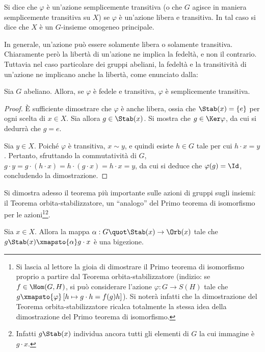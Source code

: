 \documentclass[12pt]{scrartcl}
\begin{document}
	\begin{definition}
		Si dice che $\varphi$ è un'azione semplicemente transitiva (o che $G$ agisce in
		maniera semplicemente transitiva su $X$) se $\varphi$ è un'azione libera e
		transitiva. In tal caso si dice che $X$ è un $G$-insieme omogeneo principale.
	\end{definition} \medskip
	
	In generale, un'azione può essere solamente libera o solamente transitiva. Chiaramente
	però la libertà di un'azione ne implica la fedeltà, e non il contrario. Tuttavia
	nel caso particolare dei gruppi abeliani, la fedeltà e la transitività di un'azione
	ne implicano anche la libertà, come enunciato dalla:
	
	\begin{proposition}
		Sia $G$ abeliano. Allora, se $\varphi$ è fedele e transitiva, $\varphi$ è
		semplicemente transitiva.
	\end{proposition}
	
	\begin{proof}
		È sufficiente dimostrare che $\varphi$ è anche libera, ossia che $\Stab(x) = \{e\}$
		per ogni scelta di $x \in X$. Sia allora $g \in \Stab(x)$. Si mostra che
		$g \in \Ker \varphi$, da cui si dedurrà che $g = e$. \medskip
		
		
		Sia $y \in X$. Poiché $\varphi$ è transitiva, $x \sim y$, e quindi esiste
		$h \in G$ tale per cui $h \cdot x = y$. Pertanto, sfruttando la commutatività
		di $G$, $g \cdot y = g \cdot (h \cdot x) =
		h \cdot (g \cdot x) = h \cdot x = y$, da cui si deduce che $\varphi(g) = \Id$,
		concludendo la dimostrazione.
	\end{proof} \bigskip
	
	Si dimostra adesso il teorema più importante sulle azioni di gruppi sugli insiemi: il
	Teorema orbita-stabilizzatore, un ``analogo'' del Primo teorema di isomorfismo per
	le azioni\footnote{Si lascia al lettore la gioia di dimostrare il Primo teorema di isomorfismo proprio a partire dal Teorema orbita-stabilizzatore (indizio: se $f \in \Hom(G,H)$, si può considerare l'azione $\varphi : G \to S(H)$ tale che $g \xmapsto{\varphi} \left[ h \mapsto g \cdot h = f(g)h \right]$). Si noterà infatti
	che la dimostrazione del Teorema orbita-stabilizzatore ricalca totalmente la
	stessa idea della dimostrazione del Primo teorema di isomorfismo.}\footnote{
		Infatti $g \Stab(x)$ individua ancora tutti gli elementi di $G$ la cui immagine
		è $g \cdot x$.
	}.
	
	\begin{theorem}
		Sia $x \in X$. Allora la mappa $\alpha : G \quot \Stab(x) \to \Orb(x)$ tale
		che $g \Stab(x) \xmapsto{\alpha} g \cdot x$ è una bigezione.
	\end{theorem}
	
\end{document}
